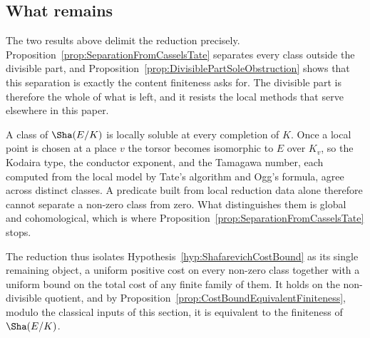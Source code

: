 \documentclass[10pt, reqno]{amsart}
\theoremstyle{plain}
\theoremstyle{definition}
\theoremstyle{plain}
\begin{document}
\subsection{What remains}
\label{subsec:BSDWhatRemains}

The two results above delimit the reduction precisely. Proposition~\ref{prop:SeparationFromCasselsTate} separates every class outside the divisible part, and Proposition~\ref{prop:DivisiblePartSoleObstruction} shows that this separation is exactly the content finiteness asks for. The divisible part is therefore the whole of what is left, and it resists the local methods that serve elsewhere in this paper.

A class of $\Sha(E/K)$ is locally soluble at every completion of $K$. Once a local point is chosen at a place $v$ the torsor becomes isomorphic to $E$ over $K_v$, so the Kodaira type, the conductor exponent, and the Tamagawa number, each computed from the local model by Tate's algorithm and Ogg's formula, agree across distinct classes. A predicate built from local reduction data alone therefore cannot separate a non-zero class from zero. What distinguishes them is global and cohomological, which is where Proposition~\ref{prop:SeparationFromCasselsTate} stops.

The reduction thus isolates Hypothesis~\ref{hyp:ShafarevichCostBound} as its single remaining object, a uniform positive cost on every non-zero class together with a uniform bound on the total cost of any finite family of them. It holds on the non-divisible quotient, and by Proposition~\ref{prop:CostBoundEquivalentFiniteness}, modulo the classical inputs of this section, it is equivalent to the finiteness of $\Sha(E/K)$.




\end{document}
